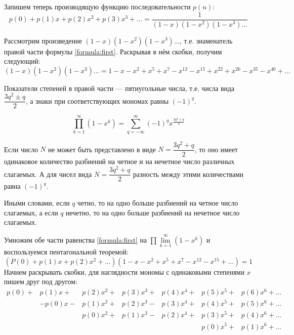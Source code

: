 Запишем теперь производящую функцию последовательности $p(n)$:
\begin{equation}\label{formula:first}
p(0) + p(1)x + p(2)x^2 + p(3)x^3 + \dots = \dfrac{1}{(1-x)(1-x^2)(1-x^3) \dots}
\end{equation}

Рассмотрим произведение $(1 - x)(1 - x^2)(1 - x^3) \dots$, т.е. знаменатель правой части формулы \eqref{formula:first}. Раскрывая в нём скобки, получим следующий:
\[ (1 - x)(1 - x^2)(1 - x^3) \dots = 1 - x - x^2 + x^5 + x^7 - x^{12} - x^{15} + x^{22} + x^{26} - x^{35} - x^{40} + \dots \]

Показатели степеней в правой части — пятиугольные числа, т.е. числа вида $\dfrac{3q^2 \pm q}{2}$, а знаки при соответствующих мономах равны $(-1)^q$.

\begin{theorem}
	\[ \prod_{k=1}^{\infty} (1 - x^k) = \sum_{q = - \infty}^{\infty} (-1)^q x^{\frac{3q^2+q}{2}} \]
\end{theorem}

\begin{theorem}
	Если число $N$ не может быть представлено в виде $N = \dfrac{3q^2+q}{2}$, то оно имеет одинаковое количество разбиений на четное и на нечетное число различных слагаемых. А для чисел вида $N = \dfrac{3q^2+q}{2}$ разность между этими количествами равна $(-1)^q$.
	
	Иными словами, если $q$ четно, то на одно больше разбиений на четное число слагаемых, а если $q$ нечетно, то на одно больше разбиений на нечетное число слагаемых.
\end{theorem}

Умножим обе части равенства \eqref{formula:first} на $\prod\lim\limits_{k=1}^{\infty}(1-x^k)$ и воспользуемся пентагональной теоремой:
\begin{equation}\label{formula:second}
(P(0) + p(1)x + p(2)x^2 + \dots)(1 - x - x^2 + x^5 + x^7 - x^{12} - x^{15} + \dots) = 1
\end{equation}
Начнем раскрывать скобки, для наглядности мономы с одинаковыми степенями $x$ пишем друг под другом:
\begin{align}
p(0) + &p(1)x + &p(2)x^2 + &p(3)x^3 + &p(4)x^4 + &p(5)x^5 + &p(6)x^6 + \dots \\
	   &-p(0)x - &p(1)x^2 + &p(2)x^3 - &p(3)x^4 + &p(4)x^5 + &p(5)x^6 + \dots \\
	   &	     & p(0)x^2 + &p(1)x^3 - &p(2)x^4 + &p(3)x^5 + &p(4)x^6 + \dots \\
	   &		 &	 		 &	        &		   &p(0)x^5 + &p(1)x^6 + \dots
\end{align}

